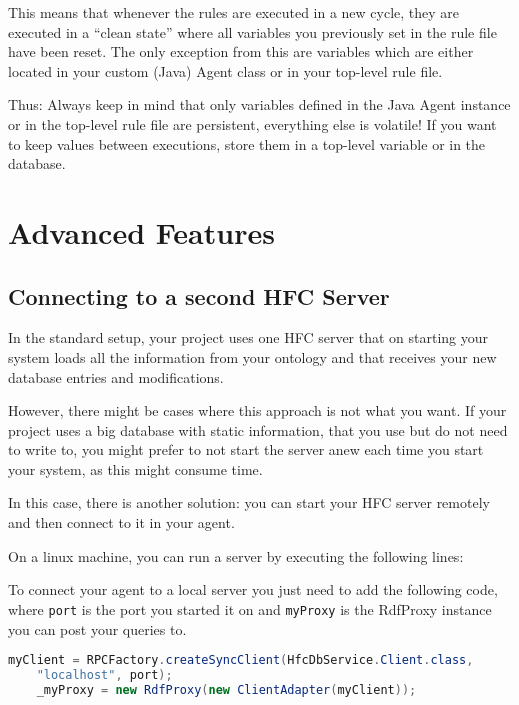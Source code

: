 This means that whenever the \vonda rules are executed in a new cycle,
they are executed in a ``clean state'' where all variables you
previously set in the rule file have been reset. The only exception
from this are variables which are either located in your custom (Java)
Agent class or in your top-level rule file.

Thus: Always keep in mind that only variables defined in the Java
Agent instance or in the top-level rule file are persistent,
everything else is volatile! If you want to keep values between
executions, store them in a top-level variable or in the database.

\section{Advanced Features}

\subsection{Connecting to a second HFC Server} \label{sec:2ndHfc}
In the standard setup, your \vonda project uses one HFC server that on starting your system loads all the information from your ontology and that receives your new database entries and modifications.

However, there might be cases where this approach is not what you want. If your project uses a big database with static information, that you use but do not need to write to, you might prefer to not start the server anew each time you start your system, as this might consume time.


In this case, there is another solution: you can start your HFC server remotely and then connect to it in your \vonda agent.

On a linux machine, you can run a server by executing the following lines:

To connect your \vonda agent to a local server you just need to add the following code, where \texttt{port} is the port you started it on and \texttt{myProxy} is the RdfProxy instance you can post your queries to.

\begin{center}
	\begin{lstlisting}[language=Java]
	myClient = RPCFactory.createSyncClient(HfcDbService.Client.class,
	"localhost", port);
	_myProxy = new RdfProxy(new ClientAdapter(myClient));
	\end{lstlisting}
\end{center}

